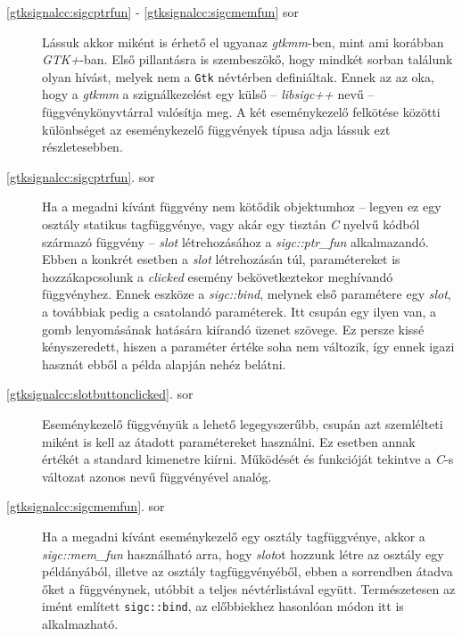\begin{description}
 \item[\ref{gtksignalcc:sigcptrfun} - \ref{gtksignalcc:sigcmemfun} sor] Lássuk akkor miként is érhető el ugyanaz \textit{gtkmm}-ben, mint ami korábban \textit{GTK+}-ban. Első pillantásra is szembeszökő, hogy mindkét sorban találunk olyan hívást, melyek nem a \texttt{Gtk} névtérben definiáltak. Ennek az az oka, hogy a \textit{gtkmm} a szignálkezelést egy külső -- \textit{libsigc++} nevű -- függvénykönyvtárral valósítja meg. A két eseménykezelő felkötése közötti különbséget az eseménykezelő függvények típusa adja lássuk ezt részletesebben.

 \item[\ref{gtksignalcc:sigcptrfun}. sor] Ha a megadni kívánt függvény nem kötődik objektumhoz -- legyen ez egy osztály statikus tagfüggvénye, vagy akár egy tisztán \textit{C} nyelvű kódból származó függvény -- \textit{slot} létrehozásához a \textit{sigc::ptr\_fun} alkalmazandó. Ebben a konkrét esetben a \textit{slot} létrehozásán túl, paramétereket is hozzákapcsolunk a \textit{clicked} esemény bekövetkeztekor meghívandó függvényhez. Ennek eszköze a \textit{sigc::bind}, melynek első paramétere egy \textit{slot}, a továbbiak pedig a csatolandó paraméterek. Itt csupán egy ilyen van, a gomb lenyomásának hatására kiírandó üzenet szövege. Ez persze kissé kényszeredett, hiszen a paraméter értéke soha nem változik, így ennek igazi hasznát ebből a példa alapján nehéz belátni.

 \item[\ref{gtksignalcc:slotbuttonclicked}. sor] Eseménykezelő függvényük a lehető legegyszerűbb, csupán azt szemlélteti miként is kell az átadott paramétereket használni. Ez esetben annak értékét a standard kimenetre kiírni. Működését és funkcióját tekintve a \textit{C}-s változat azonos nevű függvényével analóg.

 \item[\ref{gtksignalcc:sigcmemfun}. sor] Ha a megadni kívánt eseménykezelő egy osztály tagfüggvénye, akkor a \textit{sigc::mem\_fun} használható arra, hogy \textit{slot}ot hozzunk létre az osztály egy példányából, illetve az osztály tagfüggvényéből, ebben a sorrendben átadva őket a függvénynek, utóbbit a teljes névtérlistával együtt. Természetesen az imént említett \texttt{sigc::bind}, az előbbiekhez hasonlóan módon itt is alkalmazható. 


\end{description}
